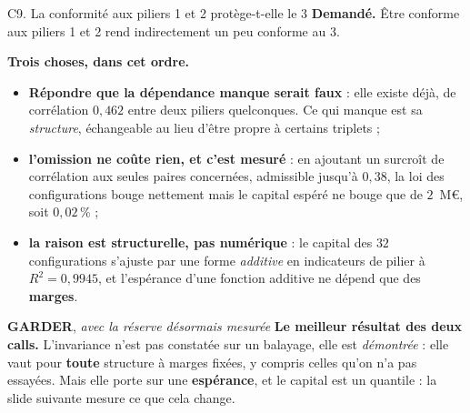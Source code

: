 \documentclass[11pt]{beamer}
\newcommand{\garder}{\textbf{GARDER}}
\newcommand{\srcs}[1]{\vspace{0.8mm}{\tiny\textcolor{gray!50!black}{Sources : #1}}}
\begin{document}
\begin{frame}{C9. La conformité aux piliers 1 et 2 protège-t-elle le 3}
\scriptsize
\textbf{Demandé.} Être conforme aux piliers 1 et 2 rend indirectement un peu conforme au 3.
\vspace{1mm}

\textbf{Trois choses, dans cet ordre.}
\begin{itemize}\itemsep1pt
\item \textbf{Répondre que la dépendance manque serait faux} : elle existe déjà, de corrélation
$0{,}462$ entre deux piliers quelconques. Ce qui manque est sa \emph{structure}, échangeable au
lieu d'être propre à certains triplets ;
\item \textbf{l'omission ne coûte rien, et c'est mesuré} : en ajoutant un surcroît de
corrélation aux seules paires concernées, admissible jusqu'à $0{,}38$, la loi des configurations
bouge nettement mais le capital espéré ne bouge que de $2$~M\euro, soit $0{,}02\,\%$ ;
\item \textbf{la raison est structurelle, pas numérique} : le capital des $32$ configurations
s'ajuste par une forme \emph{additive} en indicateurs de pilier à $R^2 = 0{,}9945$, et
l'espérance d'une fonction additive ne dépend que des \textbf{marges}.
\end{itemize}
\begin{block}{\garder, \emph{avec la réserve désormais mesurée}}
\textbf{Le meilleur résultat des deux calls.} L'invariance n'est pas constatée sur un balayage,
elle est \emph{démontrée} : elle vaut pour \textbf{toute} structure à marges fixées, y compris
celles qu'on n'a pas essayées. Mais elle porte sur une \textbf{espérance}, et le capital est un
quantile : la slide suivante mesure ce que cela change.
\end{block}
\srcs{script~\texttt{69}}
\end{frame}
\end{document}
